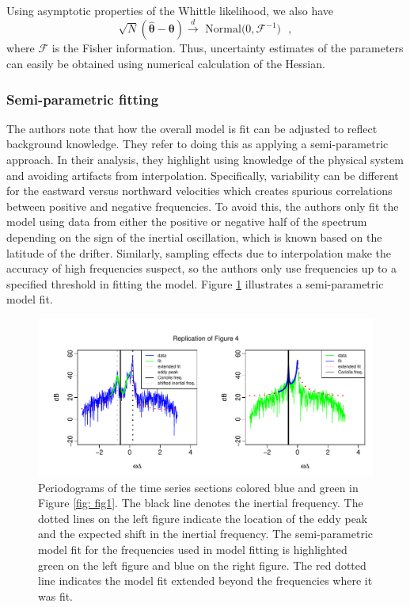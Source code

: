 \documentclass{stat572Style}
\begin{document}
Using asymptotic properties of the Whittle likelihood, we also have 
\begin{equation}
\label{eq: fisher}
\sqrt{N}(\hat{\boldsymbol{\theta}} - \boldsymbol{\theta}) \overset{d}{\rightarrow} \text{ Normal($0, \boldsymbol{\mathcal{F}}^{-1})$ },
\end{equation}
where $\boldsymbol{\mathcal{F}}$ is the Fisher information. 
Thus, uncertainty estimates of the parameters can easily be obtained using numerical calculation of the Hessian. 

\subsubsection{Semi-parametric fitting}
\label{sec: semi}
The authors note that how the overall model is fit can be adjusted to reflect background knowledge.
They refer to doing this as applying a semi-parametric approach.  
In their analysis, they highlight using knowledge of the physical system and avoiding artifacts from interpolation. 
Specifically,  variability can be different for the eastward versus northward velocities  which creates spurious correlations between positive and negative frequencies. 
To avoid this, the authors only fit the model using data from either the positive or negative half of the spectrum depending on the sign of the inertial oscillation, which is known based on the latitude of the drifter.  
Similarly, sampling effects due to interpolation make the accuracy of high frequencies suspect, so the authors only use frequencies up to a specified threshold in fitting the model. Figure \ref{fig: fig4} illustrates a semi-parametric model fit. 

\begin{figure}[h!]
  \centering
    \includegraphics[width=.95\textwidth]{ReplicatedFigures/fig4.pdf}
        \caption{Periodograms of the time series sections colored blue and green in Figure \ref{fig: fig1}. The black line denotes the inertial frequency.   The dotted lines on the left figure indicate the location of the eddy peak and the expected shift in the inertial frequency. The semi-parametric model fit for the frequencies used in model fitting is highlighted green on the left figure and blue on the right figure. The red dotted line indicates the model fit extended beyond the frequencies where it was fit. }
        	\label{fig: fig4}
\end{figure}
\end{document}

